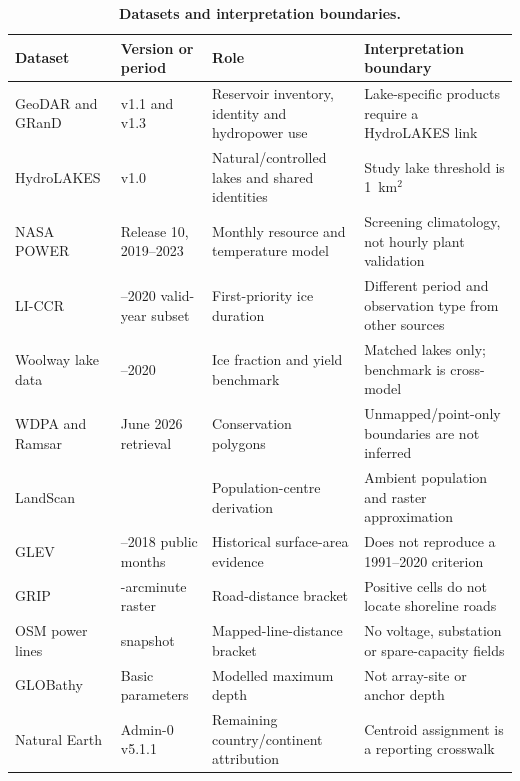 \begin{table}[H]
\centering
\caption{\textbf{Datasets and interpretation boundaries.}}
\label{tab:S1}
\scriptsize
\begin{tabularx}{\textwidth}{>{\RaggedRight\arraybackslash}p{2.1cm}>{\RaggedRight\arraybackslash}p{2.2cm}>{\RaggedRight\arraybackslash}p{2.7cm}>{\RaggedRight\arraybackslash}X}
\toprule
Dataset & Version or period & Role & Interpretation boundary \\
\midrule
GeoDAR and GRanD & v1.1 and v1.3 & Reservoir inventory, identity and hydropower use & Lake-specific products require a HydroLAKES link \\
HydroLAKES & v1.0 & Natural/controlled lakes and shared identities & Study lake threshold is 1~km$^2$ \\
NASA POWER & Release 10, 2019--2023 & Monthly resource and temperature model & Screening climatology, not hourly plant validation \\
LI-CCR & 2002--2020 valid-year subset & First-priority ice duration & Different period and observation type from other sources \\
Woolway lake data & 1991--2020 & Ice fraction and yield benchmark & Matched lakes only; benchmark is cross-model \\
WDPA and Ramsar & June 2026 retrieval & Conservation polygons & Unmapped/point-only boundaries are not inferred \\
LandScan & 2024 & Population-centre derivation & Ambient population and raster approximation \\
GLEV & 1991--2018 public months & Historical surface-area evidence & Does not reproduce a 1991--2020 criterion \\
GRIP & 5-arcminute raster & Road-distance bracket & Positive cells do not locate shoreline roads \\
OSM power lines & 2016 snapshot & Mapped-line-distance bracket & No voltage, substation or spare-capacity fields \\
GLOBathy & Basic parameters & Modelled maximum depth & Not array-site or anchor depth \\
Natural Earth & Admin-0 v5.1.1 & Remaining country/continent attribution & Centroid assignment is a reporting crosswalk \\
\bottomrule
\end{tabularx}
\end{table}

